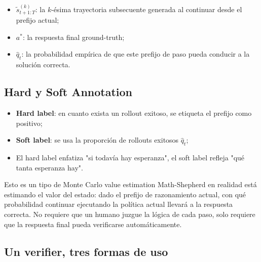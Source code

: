 \documentclass[a4paper]{article}
\begin{document}
\begin{itemize}
    \item $\tilde s^{(k)}_{t+1:T}$: la $k$-ésima trayectoria subsecuente generada al continuar desde el prefijo actual;
    \item $a^*$: la respuesta final ground-truth;
    \item $\hat q_t$: la probabilidad empírica de que este prefijo de paso pueda conducir a la solución correcta.
\end{itemize}


\subsection{Hard y Soft Annotation}

\begin{itemize}
    \item \textbf{Hard label}: en cuanto exista un rollout exitoso, se etiqueta el prefijo como positivo;
    \item \textbf{Soft label}: se usa la proporción de rollouts exitosos $\hat q_t$;
    \item El hard label enfatiza "si todavía hay esperanza", el soft label refleja "qué tanta esperanza hay".
\end{itemize}


\begin{knowledgebox}{Esto es un tipo de Monte Carlo value estimation}
Math-Shepherd en realidad está estimando el valor del estado: dado el prefijo de razonamiento actual, con qué probabilidad continuar ejecutando la política actual llevará a la respuesta correcta. No requiere que un humano juzgue la lógica de cada paso, solo requiere que la respuesta final pueda verificarse automáticamente.
\end{knowledgebox}

\subsection{Un verifier, tres formas de uso}

\end{document}
